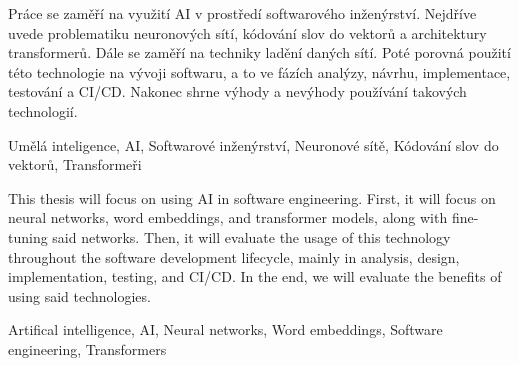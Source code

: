 \documentclass[FM,DP]{tulthesis}
\begin{document}
		
		
		\begin{abstractCZ}
			Práce se zaměří na využití AI v prostředí softwarového inženýrství. Nejdříve uvede problematiku neuronových sítí, kódování slov do vektorů a architektury transformerů. Dále se zaměří na techniky ladění daných sítí. Poté porovná použití této technologie na vývoji softwaru, a to ve fázích analýzy, návrhu, implementace, testování a CI/CD. Nakonec shrne výhody a nevýhody používání takových technologií.
		\end{abstractCZ}
		\begin{keywordsCZ}
			Umělá inteligence, AI, Softwarové inženýrství, Neuronové sítě, Kódování slov do vektorů, Transformeři
		\end{keywordsCZ}
		\vspace{1cm}
		
		\begin{abstractEN}
			This thesis will focus on using AI in software engineering. First, it will focus on neural networks, word embeddings, and transformer models, along with fine-tuning said networks. Then, it will evaluate the usage of this technology throughout the software development lifecycle, mainly in analysis, design, implementation, testing, and CI/CD. In the end, we will evaluate the benefits of using said technologies.
		\end{abstractEN}
		
		\begin{keywordsEN}
			Artifical intelligence, AI, Neural networks, Word embeddings, Software engineering, Transformers
		\end{keywordsEN}
		
		\clearpage
		
		\tableofcontents
		
		\clearpage
		
\end{document}
